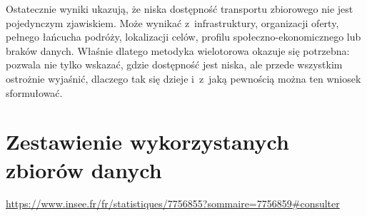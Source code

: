 \documentclass{pracamgr}
\begin{document}
Ostatecznie wyniki ukazują, że niska dostępność transportu zbiorowego nie jest pojedynczym zjawiskiem. Może wynikać z~infrastruktury, organizacji oferty, pełnego łańcucha podróży, lokalizacji celów, profilu społeczno-ekonomicznego lub braków danych. Właśnie dlatego metodyka wielotorowa okazuje się potrzebna: pozwala nie tylko wskazać, gdzie dostępność jest niska, ale przede wszystkim ostrożnie wyjaśnić, dlaczego tak się dzieje i~z~jaką pewnością można ten wniosek sformułować.


\chapter*{Zestawienie wykorzystanych zbiorów danych}

\urldef{\inseeURL}\url{https://www.insee.fr/fr/statistiques/7756855?sommaire=7756859#consulter}

\begingroup %
\footnotesize
\renewcommand{\arraystretch}{1.4}
\setlength{\tabcolsep}{4pt}

\setlength{\LTleft}{-0.7cm}
\setlength{\LTright}{-0.7cm}
\end{document}
